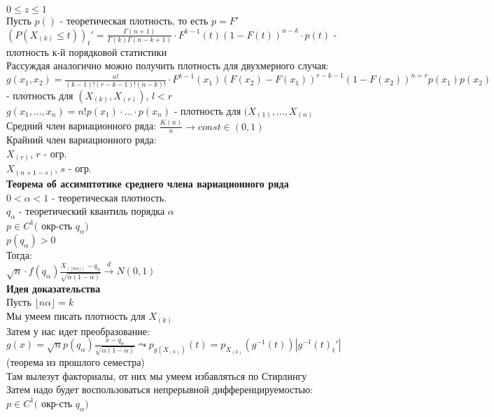 \documentclass{article}
\newcommand\0{\mathbb{0}}
\newcommand\1{\mathbb{1}}
\begin{document}
$0 \leq z \leq 1$\\
Пусть $p()$ - теоретическая плотность, то есть $p = F'$\\
$(P(X_(k) \leq t))_t' = \frac{\Gamma(n + 1)}{\Gamma(k) \Gamma(n - k + 1)} \cdot F^{k - 1}(t)(1 - F(t))^{n - k} \cdot p(t)$ - плотность к-й порядковой статистики\\
Рассуждая аналогично можно получить плотность для двухмерного случая:\\
$g(x_1,x_2) = \frac{n!}{(k - 1)!(r - k - 1)!(n - k)!} \cdot F^{k - 1}(x_1)(F(x_2) - F(x_1))^{r - k - 1}(1 - F(x_2))^{n = r}p(x_1)p(x_2)$ - плотность для $(X_{(k)}, X_{(r)})$, $l < r$\\
$g(x_1, \dots,x_n) = n!p(x_1)\cdot \dots \cdot p(x_n)$ - плотность для $(X_{(1)}, \dots, X_{(n)}$\\
Средний член вариационного ряда: $\frac{K(n)}{n} \to const \in (0,1)$\\
Крайний член вариационного ряда:\\
$X_{(r)}$, $r$ - огр.\\
$X_{(n + 1 - s)}$, $s$ - огр.\\
\textbf{Теорема об ассимптотике среднего члена вариационного ряда}\\
$0 < \alpha < 1$ - теоретическая плотность.\\
$q_\alpha$ - теоретический квантиль порядка $\alpha$\\
$p \in C^1($ окр-сть $q_\alpha)$\\
$p(q_\alpha) > 0$\\
Тогда:\\
$\sqrt{n} \cdot f(q_\alpha) \frac{X_{(\lfloor n \alpha \rfloor)} - q_\alpha}{\sqrt{\alpha (1 - \alpha)}} \xrightarrow[]{d} N(0, 1)$\\
\textbf{Идея доказательства}\\
Пусть $\lfloor n \alpha \rfloor = k$\\
Мы умеем писать плотность для $X_{(k)}$\\
Затем у нас идет преобразование:\\
$g(x) = \sqrt{n}p(q_\alpha)\frac{x - q_\alpha}{\sqrt{\alpha(1 - \alpha)}} \leadsto p_{g(X_{(k)})}(t) = p_{X_{(k)}}(g^{-1}(t))|g^{-1}(t)_t'|$ (теорема из прошлого семестра)\\
Там вылезут факториалы, от них мы умеем избавляться по Стирлингу\\
Затем надо будет воспользоваться непрерывной дифференцируемостью:\\
$p \in C^1($ окр-сть $q_\alpha)$\\
\end{document}
